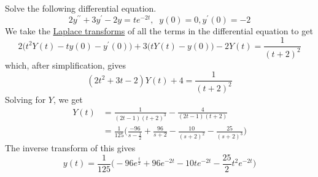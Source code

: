 \documentclass{article}
\newcounter{example}[section]
\begin{document}
    \begin{example}
      \label{ex:solving-a-nonhomogeneous-equation-by-transform}
    Solve the following differential equation. 
    \begin{equation}
      2 y^{\prime\prime} + 3 y^\prime - 2y = t e^{-2t}, \;\; y(0) = 0, y^\prime (0) = -2
    \end{equation}
    We take the \hyperref[def:laplace-transform]{Laplace transforms} of all the terms in the differential equation to get
    \begin{equation}
      2\big( t^2 Y(t) - t y(0) - y^\prime (0)\big) + 3 \big( t Y(t) - y(0)\big) - 2 Y(t) = \frac{1}{(t+2)^2}
    \end{equation}
    which, after simplification, gives
    \begin{equation}
      (2t^2 + 3t - 2) Y(t) + 4 = \frac{1}{(t+2)^2}
    \end{equation}
    Solving for $Y$, we get
    \begin{align*}
        Y(t) & = \frac{1}{(2t-1)(t+2)^3} - \frac{4}{(2t-1)(t+2)} \\
        & = \frac{1}{125} \bigg(\frac{-96}{s-\frac{1}{2}} + \frac{96}{s+2} - \frac{10}{(s+2)^2} - \frac{25}{(s+2)^3} \bigg)
    \end{align*}
    The inverse transform of this gives 
    \begin{equation}
      y(t) = \frac{1}{125} \Big( -96 e^{\frac{t}{2}} + 96 e^{-2t} - 10t e^{-2t} - \frac{25}{2} t^2 e^{-2t}\Big)
    \end{equation}
    \end{example}
\end{document}
